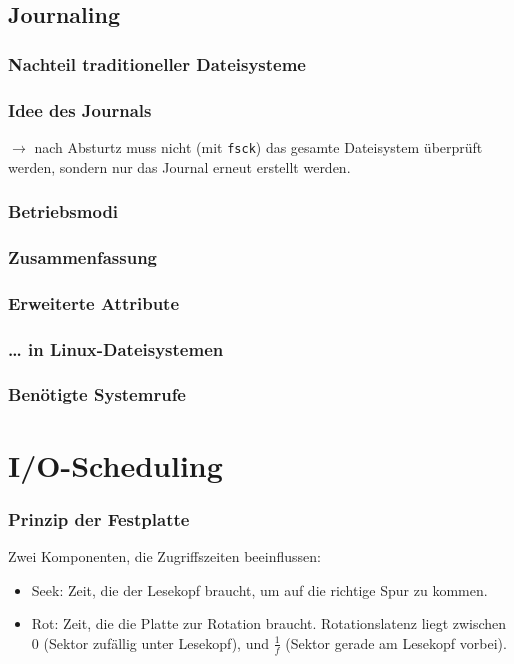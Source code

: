 \subsection{Journaling}
\subsubsection{Nachteil traditioneller Dateisysteme}
\subsubsection{Idee des Journals}
$\to$ nach Absturtz muss nicht (mit \lstinline`fsck`) das gesamte Dateisystem überprüft werden, sondern nur das Journal erneut erstellt werden.
\subsubsection{Betriebsmodi}
\subsubsection{Zusammenfassung}
\subsubsection{Erweiterte Attribute}
\subsubsection*{… in Linux-Dateisystemen}
\subsubsection*{Benötigte Systemrufe}

\section{I/O-Scheduling}
\subsubsection*{Prinzip der Festplatte}
Zwei Komponenten, die Zugriffszeiten beeinflussen:
\begin{itemize}
\item Seek: Zeit, die der Lesekopf braucht, um auf die richtige Spur zu kommen.
\item Rot: Zeit, die die Platte zur Rotation braucht. Rotationslatenz liegt zwischen $0$ (Sektor zufällig unter Lesekopf), und $\frac{1}{f}$ (Sektor gerade am Lesekopf vorbei).
\end{itemize}

